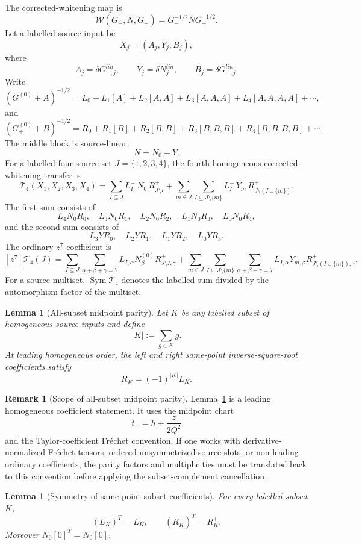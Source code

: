 \documentclass[11pt,a4paper]{amsart}
\def\lin{lin}%
\theoremstyle{plain}
\newtheorem{lemma}[theorem]{Lemma}
\theoremstyle{definition}
\newtheorem{remark}[theorem]{Remark}
\newcommand{\lin}{\mathrm{lin}}
\begin{document}
The corrected-whitening map is
\[
\mathcal W(G_-,N,G_+)=G_-^{-1/2}NG_+^{-1/2}.
\]
Let a labelled source input be
\[
X_j=(A_j,Y_j,B_j),
\]
where
\[
A_j=\delta G_{-,j}^{\lin},\qquad
Y_j=\delta N_j^{\lin},\qquad
B_j=\delta G_{+,j}^{\lin}.
\]
Write
\[
(G_-^{(0)}+A)^{-1/2}
=
L_0+L_1[A]+L_2[A,A]+L_3[A,A,A]+L_4[A,A,A,A]+\cdots,
\]
and
\[
(G_+^{(0)}+B)^{-1/2}
=
R_0+R_1[B]+R_2[B,B]+R_3[B,B,B]+R_4[B,B,B,B]+\cdots.
\]
The middle block is source-linear:
\[
N=N_0+Y.
\]
For a labelled four-source set \(J=\{1,2,3,4\}\), the fourth homogeneous
corrected-whitening transfer is
\[
\boxed{
\mathcal T_4(X_1,X_2,X_3,X_4)
=
\sum_{I\subseteq J}
L^-_I\,N_0\,R^+_{J\setminus I}
+
\sum_{m\in J}
\sum_{I\subseteq J\setminus\{m\}}
L^-_I\,Y_m\,R^+_{J\setminus(I\cup\{m\})}.
}
\]
The first sum consists of
\[
L_4N_0R_0,\quad
L_3N_0R_1,\quad
L_2N_0R_2,\quad
L_1N_0R_3,\quad
L_0N_0R_4,
\]
and the second sum consists of
\[
L_3YR_0,\quad
L_2YR_1,\quad
L_1YR_2,\quad
L_0YR_3.
\]
The ordinary \(z^7\)-coefficient is
\[
\boxed{
[z^7]\mathcal T_4(J)
=
\sum_{I\subseteq J}
\sum_{\alpha+\beta+\gamma=7}
L^-_{I,\alpha}N^{(0)}_{\beta}R^+_{J\setminus I,\gamma}
+
\sum_{m\in J}
\sum_{I\subseteq J\setminus\{m\}}
\sum_{\alpha+\beta+\gamma=7}
L^-_{I,\alpha}Y_{m,\beta}R^+_{J\setminus(I\cup\{m\}),\gamma}.
}
\]
For a source multiset, \(\operatorname{Sym}\mathcal T_4\) denotes the
labelled sum divided by the automorphism factor of the multiset.

\begin{lemma}[All-subset midpoint parity]
\label{lem:all-subset-midpoint-parity}
Let \(K\) be any labelled subset of homogeneous source inputs and define
\[
|K|:=\sum_{g\in K}g.
\]
At leading homogeneous order, the left and right same-point
inverse-square-root coefficients satisfy
\[
\boxed{
R_K^+=(-1)^{|K|}L_K^-.
}
\]
\end{lemma}

\begin{remark}[Scope of all-subset midpoint parity]
\label{rem:scope-all-subset-midpoint-parity}
Lemma~\ref{lem:all-subset-midpoint-parity} is a leading homogeneous
coefficient statement.  It uses the midpoint chart
\[
t_\pm=h\pm\frac{z}{2Q^2}
\]
and the Taylor-coefficient Fr\'echet convention.  If one works with
derivative-normalized Fr\'echet tensors, ordered unsymmetrized source
slots, or non-leading ordinary coefficients, the parity factors and
multiplicities must be translated back to this convention before applying
the subset-complement cancellation.
\end{remark}

\begin{lemma}[Symmetry of same-point subset coefficients]
\label{lem:symmetry-same-point-subset-coefficients}
For every labelled subset \(K\),
\[
(L_K^-)^T=L_K^-,
\qquad
(R_K^+)^T=R_K^+.
\]
Moreover \(N_0[0]^T=N_0[0]\).
\end{lemma}
\end{document}
